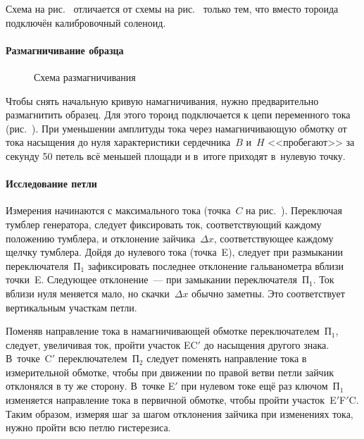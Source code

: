 Схема на рис.~ отличается от схемы на
рис.~ только тем, что вместо тороида
подключён калибровочный соленоид.

%



\paragraph{Размагничивание образца}
\begin{wrapfigure}[8]{r}{0.5\textwidth}
    \centering
    \caption{Схема размагничивания}
\end{wrapfigure}
Чтобы снять начальную кривую 
намагничивания, нужно предварительно 
размагнитить образец.
Для этого тороид подключается к цепи переменного тока
(рис.~). При уменьшении амплитуды тока через
намагничивающую обмотку от тока насыщения до нуля характеристики сердечника~$B$
и~$H$ <<пробегают>> за секунду 50 петель всё меньшей площади и в~итоге
приходят в~нулевую точку.



\paragraph{Исследование петли}
Измерения начинаются с максимального тока (точка~$C$ на рис.~). Переключая тумблер генератора,
следует фиксировать ток, соответствующий каждому положению тумблера, и
отклонение зайчика~$\Delta x$, соответствующее
каждому щелчку тумблера. Дойдя до нулевого тока
(точка~E), следует при размыкании переключателя~$\text{П}_1$ 
зафиксировать последнее отклонение гальванометра вблизи точки~E. Следующее
отклонение~--- при замыкании переключателя~$\text{П}_1$. 
Ток вблизи нуля меняется мало, но скачки~$\Delta x$ обычно заметны. 
Это соответствует вертикальным участкам петли.

Поменяв направление тока в намагничивающей обмотке переключателем~$\text{П}_1$,
следует, увеличивая ток, пройти участок EC$'$ до
насыщения другого знака. В~точке~C$'$ переключателем~$\text{П}_2$ следует
поменять направление тока в измерительной обмотке, чтобы при
движении по правой ветви петли зайчик отклонялся в ту же сторону. 
В~точке E$'$ при нулевом токе ещё раз ключом~$\text{П}_1$
изменяется направление тока в первичной обмотке, чтобы пройти участок~E$'$F$'$C.
Таким образом, измеряя шаг за шагом отклонения зайчика при изменениях тока, 
нужно пройти всю петлю гистерезиса.

